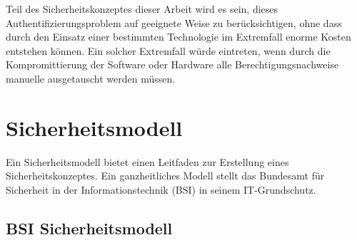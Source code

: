 \documentclass[11pt,a4paper]{report}
\begin{document}
Teil des Sicherheitskonzeptes dieser Arbeit wird es sein, dieses Authentifizierungsproblem auf geeignete Weise zu berücksichtigen, ohne dass durch den Einsatz einer bestimmten Technologie im Extremfall enorme Kosten entstehen können. Ein solcher Extremfall würde eintreten, wenn durch die Kompromittierung der Software oder Hardware alle Berechtigungsnachweise manuelle ausgetauscht werden müssen.

\section{Sicherheitsmodell}

Ein Sicherheitsmodell bietet einen Leitfaden zur Erstellung eines Sicherheitskonzeptes. Ein ganzheitliches Modell stellt das Bundesamt für Sicherheit in der Informationstechnik (BSI) in seinem IT-Grund\-schutz. 

\subsection{BSI Sicherheitsmodell}
\end{document}

